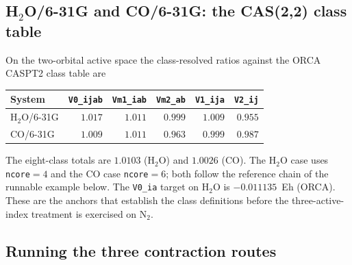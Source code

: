 \subsection{H\texorpdfstring{$_2$}{2}O/6-31G and CO/6-31G: the
CAS(2,2) class table}

On the two-orbital active space the class-resolved ratios against the
ORCA CASPT2 class table are
\begin{center}
\small
\begin{tabular}{lrrrrr}
\toprule
System & \texttt{V0\_ijab} & \texttt{Vm1\_iab} & \texttt{Vm2\_ab} &
\texttt{V1\_ija} & \texttt{V2\_ij} \\
\midrule
H$_2$O/6-31G & $1.017$ & $1.011$ & $0.999$ & $1.009$ & $0.955$ \\
CO/6-31G    & $1.009$ & $1.011$ & $0.963$ & $0.999$ & $0.987$ \\
\bottomrule
\end{tabular}
\end{center}
The eight-class totals are $1.0103$ (H$_2$O) and $1.0026$ (CO).  The
H$_2$O case uses \texttt{ncore}$=4$ and the CO case \texttt{ncore}$=6$;
both follow the reference chain of the runnable example below.  The
\texttt{V0\_ia} target on H$_2$O is $-0.011135$~Eh (ORCA).  These are
the anchors that establish the class definitions before the
three-active-index treatment is exercised on N$_2$.

\subsection{Running the three contraction routes}


